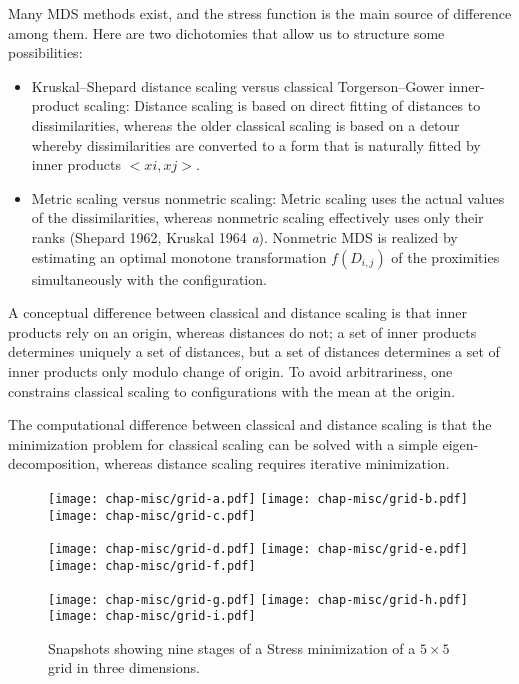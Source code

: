 
Many MDS methods exist, and the stress function is the main source of
difference among them.  Here are two dichotomies that allow us to
structure some possibilities:

\begin{itemize}

\item Kruskal--Shepard distance scaling versus classical
Torgerson--Gower inner-product scaling: Distance scaling is based on
direct fitting of distances to dissimilarities, whereas the older
classical scaling is based on a detour whereby dissimilarities are
converted to a form that is naturally fitted by inner products 
$<xi, xj>$.

\item Metric scaling versus nonmetric scaling: Metric scaling uses the
actual values of the dissimilarities, whereas nonmetric scaling
effectively uses only their ranks (Shepard 1962, Kruskal 1964{\it
a}). Nonmetric MDS is realized by estimating an optimal monotone
transformation $f(D_{i,j})$ of the proximities simultaneously with the
configuration.

\end{itemize}

A conceptual difference between classical and distance scaling is that
inner products rely on an origin, whereas distances do not; a set of
inner products determines uniquely a set of distances, but a set of
distances determines a set of inner products only modulo change of
origin. To avoid arbitrariness, one constrains classical scaling to
configurations with the mean at the origin.

The computational difference between classical and distance scaling is
that the minimization problem for classical scaling can be solved with
a simple eigen-decomposition, whereas distance scaling requires iterative
minimization. 

\begin{figure}[htbp]
\centerline{
  \texttt{[image: chap-misc/grid-a.pdf]}
  \texttt{[image: chap-misc/grid-b.pdf]}
  \texttt{[image: chap-misc/grid-c.pdf]}}
\centerline{
  \texttt{[image: chap-misc/grid-d.pdf]}
  \texttt{[image: chap-misc/grid-e.pdf]}
  \texttt{[image: chap-misc/grid-f.pdf]}}
\centerline{
  \texttt{[image: chap-misc/grid-g.pdf]}
  \texttt{[image: chap-misc/grid-h.pdf]}
  \texttt{[image: chap-misc/grid-i.pdf]}}
\caption[Snapshots from MDS animation]{ Snapshots showing nine stages
of a Stress minimization of a $5\times 5$ grid in three dimensions.}
\label{gridlayout}
\end{figure}


